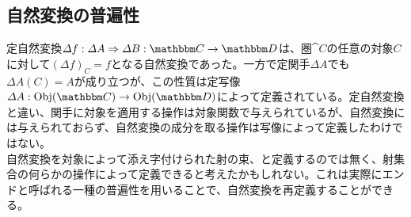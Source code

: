 \subsection{自然変換の普遍性}\label{chap-7.5-end}
  定自然変換$\natf{\varDelta f}{\varDelta A}{\varDelta B}{C}{D}$は、圏$\cat{C}$の任意の対象$C$に対して$(\varDelta f)_C=f$となる自然変換であった。一方で定関手$\varDelta A$でも$\varDelta A(C)=A$が成り立つが、この性質は定写像$\mor{\varDelta A}{\obj{C}}{\obj{D}}$によって定義されている。定自然変換と違い、関手に対象を適用する操作は対象関数で与えられているが、自然変換には与えられておらず、自然変換の成分を取る操作は写像によって定義したわけではない。\\
  自然変換を対象によって添え字付けられた射の束、と定義するのでは無く、射集合の何らかの操作によって定義できると考えたかもしれない。これは実際にエンドと呼ばれる一種の普遍性を用いることで、自然変換を再定義することができる。\\
